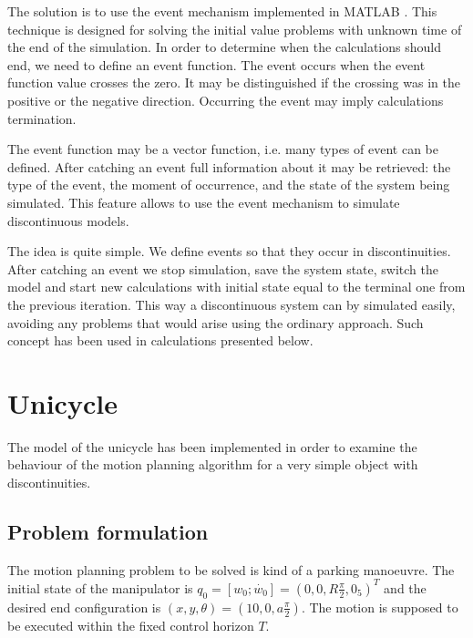The solution is to use the event mechanism implemented in MATLAB \cite{events}.
This technique is designed for solving the initial value problems with unknown time of
the end of the simulation. In order to determine when the calculations should end,
we need to define an event function. The event occurs when the event function value
crosses the zero. It may be distinguished if the crossing was in the positive or the negative direction.
Occurring the event may imply calculations termination. 

The event function may be a vector function, i.e. many types of event can be defined. After catching
an event full information about it may be retrieved: the type of the event, the moment of occurrence,
and the state of the system being simulated. This feature allows to use the event mechanism
to simulate discontinuous models.

The idea is quite simple. We define events so that they occur in discontinuities. After catching
an event we stop simulation, save the system state, switch the model and start new
calculations with initial state equal to the terminal one from the previous iteration.
This way a discontinuous system can by simulated easily, avoiding any problems that would
arise using the ordinary approach. Such concept has been used in calculations presented below.


\section{Unicycle}
The model of the unicycle has been implemented in order to examine the behaviour
of the motion planning algorithm for a very simple object with discontinuities. 

\subsection{Problem formulation}
The motion planning problem to be solved is kind of a parking manoeuvre. The initial
state of the manipulator is $q_0 = [w_0; \dot{w_0}] = (0, 0, R\frac{\pi}{2}, 0_5)^T$
and the desired end configuration is $(x, y, \theta) = (10, 0, a\frac{\pi}{2})$.
The motion is supposed to be executed within the fixed control horizon $T$.

